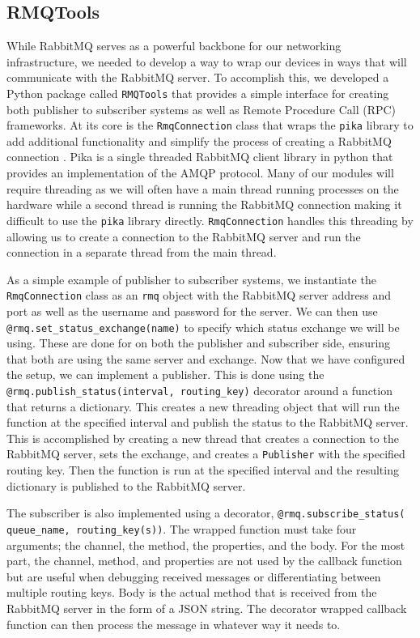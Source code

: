 \subsection{RMQTools}
While RabbitMQ serves as a powerful backbone for our networking infrastructure, we needed to develop a way to wrap our devices in ways that will communicate with the RabbitMQ server.
To accomplish this, we developed a Python package called \texttt{RMQTools} that provides a simple interface for creating both publisher to subscriber systems as well as Remote Procedure Call (RPC) frameworks.
At its core is the \texttt{RmqConnection} class that wraps the \texttt{pika} library to add additional functionality and simplify the process of creating a RabbitMQ connection \citep{pika}.
Pika is a single threaded RabbitMQ client library in python that provides an implementation of the AMQP protocol.
Many of our modules will require threading as we will often have a main thread running processes on the hardware while a second thread is running the RabbitMQ connection making it difficult to use the \texttt{pika} library directly.
\texttt{RmqConnection} handles this threading by allowing us to create a connection to the RabbitMQ server and run the connection in a separate thread from the main thread.

As a simple example of publisher to subscriber systems, we instantiate the \texttt{RmqConnection} class as an \texttt{rmq} object with the RabbitMQ server address and port as well as the username and password for the server.
We can then use \texttt{@rmq.set\_status\_exchange(name)} to specify which status exchange we will be using. 
These are done for on both the publisher and subscriber side, ensuring that both are using the same server and exchange. 
Now that we have configured the setup, we can implement a publisher.
This is done using the \texttt{@rmq.publish\_status(interval, routing\_key)} decorator around a function that returns a dictionary.
This creates a new threading object that will run the function at the specified interval and publish the status to the RabbitMQ server.
This is accomplished by creating a new thread that creates a connection to the RabbitMQ server, sets the exchange, and creates a \texttt{Publisher} with the specified routing key.
Then the function is run at the specified interval and the resulting dictionary is published to the RabbitMQ server.

The subscriber is also implemented using a decorator, \texttt{@rmq.subscribe\_status( queue\_name, routing\_key(s))}.
The wrapped function must take four arguments; the channel, the method, the properties, and the body.
For the most part, the channel, method, and properties are not used by the callback function but are useful when debugging received messages or differentiating between multiple routing keys.
Body is the actual method that is received from the RabbitMQ server in the form of a JSON string. 
The decorator wrapped callback function can then process the message in whatever way it needs to.

